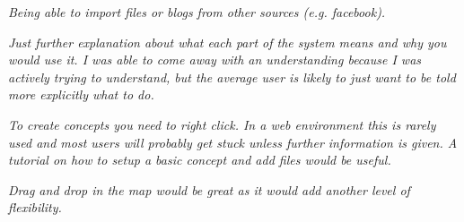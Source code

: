 \textit{Being able to import files or blogs from other sources (e.g. facebook).}

\textit{Just further explanation about what each part of the system means and
why you would use it. I was able to come away with an understanding because I
was actively trying to understand, but the average user is likely to just want
to be told more explicitly what to do. }

\textit{To create concepts you need to right click. In a web environment this is
rarely used and most users will probably get stuck unless further information is
given. A tutorial on how to setup a basic concept and add files would be useful.}

\textit{Drag and drop in the map would be great as it would add another level
of flexibility.}